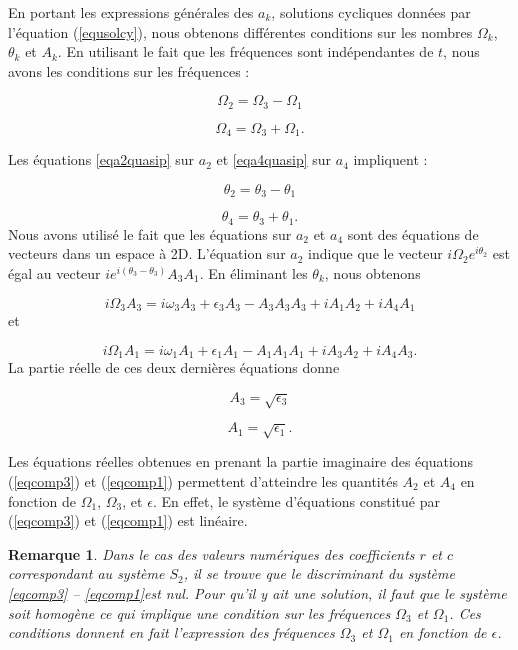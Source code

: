 \documentclass{book}
\newtheorem{rem}{Remarque}[chapter]
\begin{document}
En portant les expressions g\'en\'erales des $a_k$, solutions cycliques
donn\'ees par l'\'equation (\ref{equsolcy}), nous obtenons
diff\'erentes conditions sur les nombres $\Omega_k$, $\theta_k$ et
$A_k$.
En utilisant le fait que les fr\'equences sont ind\'ependantes de $t$,
nous avons les conditions sur les fr\'equences :

\begin{equation}\label{eqsurom2}
\Omega_2=\Omega_3-\Omega_1
\end{equation}


\begin{equation}\label{eqsurom4}
\Omega_4=\Omega_3+\Omega_1.
\end{equation}

Les \'equations \ref{eqa2quasip} sur $a_2$ et \ref{eqa4quasip} sur
$a_4$ impliquent : 


\begin{equation}
\theta_2=\theta_3-\theta_1
\end{equation}


\begin{equation}
\theta_4=\theta_3+\theta_1.
\end{equation}
Nous avons utilis\'e le fait que les \'equations sur $a_2$ et $a_4$ sont
des \'equations de vecteurs dans un espace \`a 2D. L'\'equation sur $a_2$
indique que le vecteur  $i\Omega_2e^{i\theta_2}$ est \'egal au vecteur
 $ie^{i(\theta_3-\theta_3)}A_3A_1$.
En \'eliminant les $\theta_k$, nous obtenons 

\begin{equation}\label{eqcomp3}
i\Omega_3A_3=i\omega_3A_3+\epsilon_3A_3-A_3A_3A_3+i A_1A_2+i A_4A_1
\end{equation}
et

\begin{equation}\label{eqcomp1}
i\Omega_1A_1=i\omega_1A_1+\epsilon_1A_1-A_1A_1A_1+i A_3A_2+i A_4A_3.
\end{equation}
La partie r\'eelle de ces deux derni\`eres \'equations donne

\begin{equation}\label{equamplia3}
A_3=\sqrt{\epsilon_3}
\end{equation}

\begin{equation}\label{equamplia1}
A_1=\sqrt{\epsilon_1}.
\end{equation}

Les \'equations r\'eelles obtenues en prenant la  partie imaginaire
des \'equations (\ref{eqcomp3}) et 
(\ref{eqcomp1}) permettent d'atteindre les quantit\'es $A_2$ et $A_4$
en fonction de $\Omega_1$, $\Omega_3$, et $\epsilon$.
En effet, le syst\`eme d'\'equations constitu\'e par (\ref{eqcomp3}) et 
(\ref{eqcomp1}) est lin\'eaire. 
\begin{rem}
Dans le cas des valeurs num\'eriques des coefficients $r$ et $c$
correspondant au syst\`eme $S_2$, il
se trouve que le discriminant du syst\`eme \ref{eqcomp3} --
\ref{eqcomp1}est nul. Pour qu'il y ait 
une solution, il faut que le syst\`eme soit homog\`ene ce qui implique
une condition sur les fr\'equences $\Omega_3$ et $\Omega_1$. Ces
conditions donnent en fait l'expression des fr\'equences $\Omega_3$ et
$\Omega_1$ en fonction de $\epsilon$. 
\end{rem}
\end{document}
